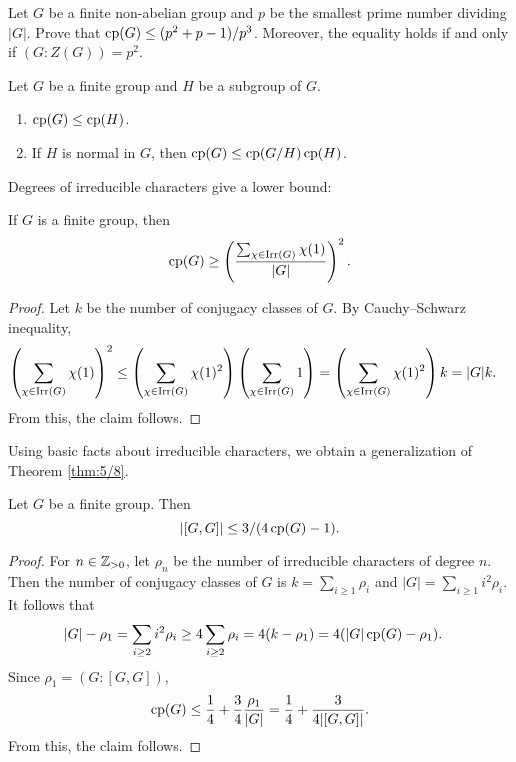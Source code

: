 \begin{exercise}
\label{xca:least_p}
    Let $G$ be a finite non-abelian group and $p$ be the smallest prime number
    dividing $|G|$. Prove that $\operatorname{cp}(G)\leq (p^2+p-1)/p^3$. Moreover, 
    the equality holds if and only if $(G:Z(G))=p^2$. 
\end{exercise}

\begin{exercise}
    Let $G$ be a finite group and $H$ be a subgroup of $G$.
    \begin{enumerate}
        \item $\operatorname{cp}(G)\leq\operatorname{cp}(H)$.
        \item If $H$ is normal in $G$, then $\operatorname{cp}(G)\leq\operatorname{cp}(G/H)\operatorname{cp}(H)$.
    \end{enumerate}
\end{exercise}

Degrees of irreducible characters give a lower bound:

\begin{proposition}
If $G$ is a finite group, then
\[
\operatorname{cp}(G)\geq\left(\frac{\sum_{\chi\in\operatorname{Irr}(G)}\chi(1)}{|G|}\right)^2.
\]
\end{proposition}

\begin{proof}
    Let $k$ be the number of conjugacy classes of $G$.
    By Cauchy--Schwarz inequality, 
    \begin{align*}
        \left(\sum_{\chi\in\operatorname{Irr}(G)}\chi(1)\right)^2
        &\leq\left(\sum_{\chi\in\operatorname{Irr}(G)}\chi(1)^2\right)\left(\sum_{\chi\in\operatorname{Irr}(G)}1\right)
        =\left(\sum_{\chi\in\operatorname{Irr}(G)}\chi(1)^2\right)k=|G|k.
    \end{align*}
    From this, the claim follows.
\end{proof}

Using basic facts about irreducible characters, 
we obtain a generalization of Theorem \ref{thm:5/8}. 

\begin{theorem}
\label{thm:[GG]}
    Let $G$ be a finite group. Then
    \[
    |[G,G]|\leq 3/(4\operatorname{cp}(G)-1).
    \]
\end{theorem}

\begin{proof}
    For $n\in\mathbb{Z}_{>0}$, let $\rho_n$ be the number
    of irreducible characters of degree $n$. Then 
    the number of conjugacy classes of $G$ is $k=\sum_{i\geq1}\rho_i$
    and $|G|=\sum_{i\geq1}i^2\rho_i$. 
    It follows that 
    \begin{align*}
    |G|-\rho_1 &=\sum_{i\geq 2}i^2\rho_i\geq 4\sum_{i\geq2}\rho_i
    =4(k-\rho_1)=4(|G|\operatorname{cp}(G)-\rho_1).
    \end{align*}
    Since $\rho_1=(G:[G,G])$, 
    \[
    \operatorname{cp}(G)\leq \frac14+\frac34\frac{\rho_1}{|G|}=\frac14+\frac3{4|[G,G]|}.
    \]
    From this, the claim follows. 
\end{proof}

